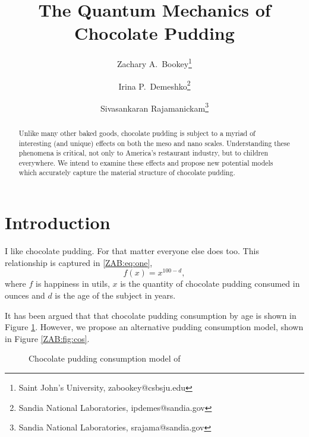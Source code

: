 \documentclass{ccr15}
\title{The Quantum Mechanics of Chocolate Pudding}
\author{Zachary A.\ Bookey\thanks{Saint John's University, zabookey@csbsju.edu} \and Irina P.\ Demeshko\thanks{Sandia National Laboratories,
ipdemes@sandia.gov} \and Sivasankaran Rajamanickam\thanks{Sandia National Laboratories, srajama@sandia.gov}}
\begin{document}
\maketitle

\begin{abstract}
Unlike many other baked goods, chocolate pudding is subject to a myriad of interesting (and unique) effects on both the
meso and nano scales.  Understanding these phenomena is critical, not only to America's restaurant industry, but to
children everywhere.  We intend to examine these effects and propose new potential models which accurately capture the
material structure of chocolate pudding.
\end{abstract}

\section{Introduction} \label{ZAB:sec:intro}
I like chocolate pudding.  For that matter everyone else does too. This relationship is captured in \eqref{ZAB:eq:one},
\begin{equation}\label{ZAB:eq:one}
f(x) = x^{100-d},
\end{equation}
where $f$ is happiness in utils, $x$ is the quantity of chocolate pudding consumed in ounces and $d$ is the age of the
subject in years.

It has been argued that that chocolate pudding consumption by age is shown in Figure \ref{ZAB:fig:Mentor05}.  However,
we propose an alternative pudding consumption model, shown in Figure \ref{ZAB:fig:cos}.

\begin{figure}[hbh]
\begin{center}
 \caption{Chocolate pudding consumption model of
\cite{ZAB:Mentor05}}\label{ZAB:fig:Mentor05}
\end{center}\end{figure}
\end{document}
